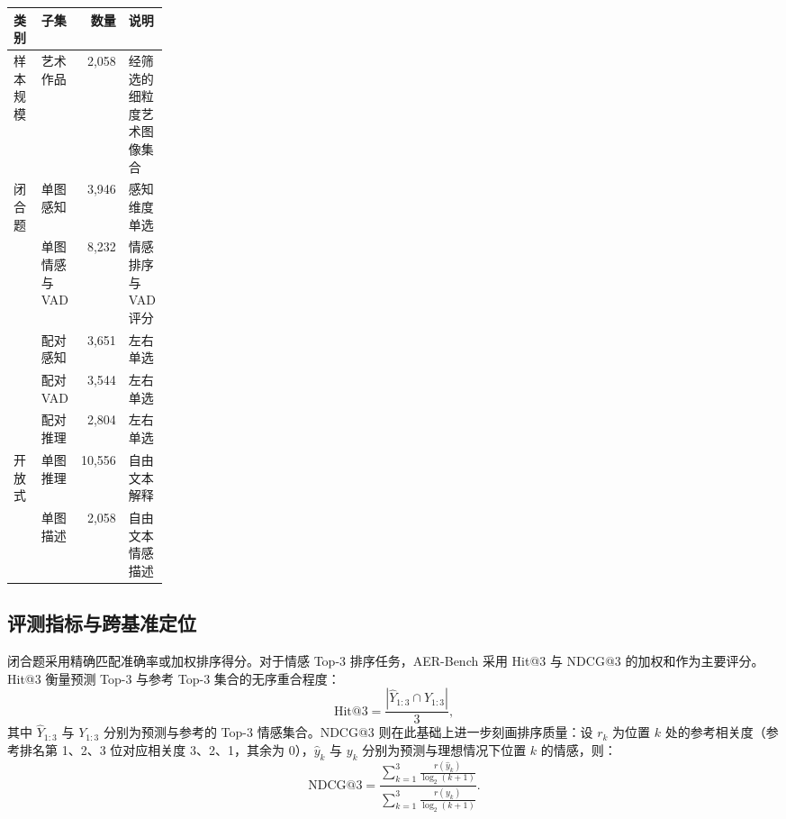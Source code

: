 \begin{table}[!htbp]
    \vspace{0.5em}\centering\wuhao
    \setlength{\tabcolsep}{4pt}
    \begin{tabularx}{\linewidth}{@{}p{0.20\linewidth}XrX@{}}
    \toprule
    \textbf{类别} & \textbf{子集} & \textbf{数量} & \textbf{说明} \\
    \midrule
    样本规模
        & 艺术作品 & 2,058 & 经筛选的细粒度艺术图像集合 \\
    \midrule
    \multirow{5}{=}{闭合题}
        & 单图感知 & 3,946 & 感知维度单选 \\
        & 单图情感与 VAD & 8,232 & 情感排序与 VAD 评分 \\
        & 配对感知 & 3,651 & 左右单选 \\
        & 配对 VAD & 3,544 & 左右单选 \\
        & 配对推理 & 2,804 & 左右单选 \\
    \midrule
    \multirow{2}{=}{开放式}
        & 单图推理 & 10,556 & 自由文本解释 \\
        & 单图描述 & 2,058 & 自由文本情感描述 \\
    \bottomrule
    \end{tabularx}
\end{table}

\subsection{评测指标与跨基准定位}

\label{sec:chap5_metrics}

闭合题采用精确匹配准确率或加权排序得分。对于情感 Top-3 排序任务，AER-Bench 采用 Hit@3 与 NDCG@3 的加权和作为主要评分。Hit@3 衡量预测 Top-3 与参考 Top-3 集合的无序重合程度：
\begin{equation}
\mathrm{Hit@3}=\frac{|\hat{Y}_{1:3}\cap Y_{1:3}|}{3},
\label{eq:chap5_hit3}
\end{equation}
其中 $\hat{Y}_{1:3}$ 与 $Y_{1:3}$ 分别为预测与参考的 Top-3 情感集合。NDCG@3 则在此基础上进一步刻画排序质量：设 $r_k$ 为位置 $k$ 处的参考相关度（参考排名第 1、2、3 位对应相关度 3、2、1，其余为 0），$\hat{y}_k$ 与 $y_k$ 分别为预测与理想情况下位置 $k$ 的情感，则：
\begin{equation}
\mathrm{NDCG@3}=\frac{\sum_{k=1}^{3}\frac{r(\hat{y}_k)}{\log_2(k+1)}}{\sum_{k=1}^{3}\frac{r(y_k)}{\log_2(k+1)}}.
\label{eq:chap5_ndcg3}
\end{equation}

